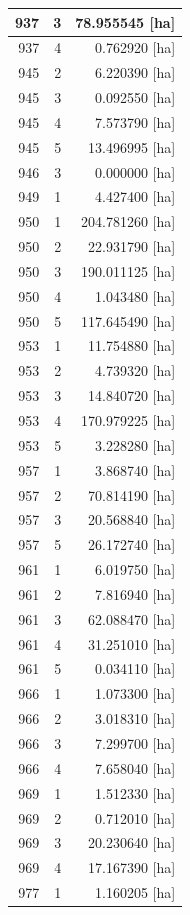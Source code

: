 \documentclass[11pt,]{book}
\begin{document}
\begin{table}
\begin{tabular}[t]{r|r|r}
\hline
937 & 3 & 78.955545 [ha]\\
\hline
937 & 4 & 0.762920 [ha]\\
\hline
945 & 2 & 6.220390 [ha]\\
\hline
945 & 3 & 0.092550 [ha]\\
\hline
945 & 4 & 7.573790 [ha]\\
\hline
945 & 5 & 13.496995 [ha]\\
\hline
946 & 3 & 0.000000 [ha]\\
\hline
949 & 1 & 4.427400 [ha]\\
\hline
950 & 1 & 204.781260 [ha]\\
\hline
950 & 2 & 22.931790 [ha]\\
\hline
950 & 3 & 190.011125 [ha]\\
\hline
950 & 4 & 1.043480 [ha]\\
\hline
950 & 5 & 117.645490 [ha]\\
\hline
953 & 1 & 11.754880 [ha]\\
\hline
953 & 2 & 4.739320 [ha]\\
\hline
953 & 3 & 14.840720 [ha]\\
\hline
953 & 4 & 170.979225 [ha]\\
\hline
953 & 5 & 3.228280 [ha]\\
\hline
957 & 1 & 3.868740 [ha]\\
\hline
957 & 2 & 70.814190 [ha]\\
\hline
957 & 3 & 20.568840 [ha]\\
\hline
957 & 5 & 26.172740 [ha]\\
\hline
961 & 1 & 6.019750 [ha]\\
\hline
961 & 2 & 7.816940 [ha]\\
\hline
961 & 3 & 62.088470 [ha]\\
\hline
961 & 4 & 31.251010 [ha]\\
\hline
961 & 5 & 0.034110 [ha]\\
\hline
966 & 1 & 1.073300 [ha]\\
\hline
966 & 2 & 3.018310 [ha]\\
\hline
966 & 3 & 7.299700 [ha]\\
\hline
966 & 4 & 7.658040 [ha]\\
\hline
969 & 1 & 1.512330 [ha]\\
\hline
969 & 2 & 0.712010 [ha]\\
\hline
969 & 3 & 20.230640 [ha]\\
\hline
969 & 4 & 17.167390 [ha]\\
\hline
977 & 1 & 1.160205 [ha]\\

\end{tabular}
\end{table}
\end{document}
